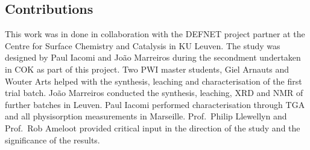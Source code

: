 \subsection*{Contributions}

This work was in done in collaboration with the DEFNET project partner
at the Centre for Surface Chemistry and Catalysis in KU Leuven. 
The study was designed by Paul Iacomi and João Marreiros during 
the secondment undertaken in COK as part of this project.
Two PWI master students, Giel Arnauts and Wouter Arts helped with
the synthesis, leaching and characterisation of the first trial batch.
João Marreiros conducted the synthesis, leaching, XRD and NMR of
further batches in Leuven. Paul Iacomi performed characterisation
through TGA and all physisorption measurements in Marseille.
Prof.\ Philip Llewellyn and Prof.\ Rob Ameloot provided critical
input in the direction of the study and the significance of the 
results.